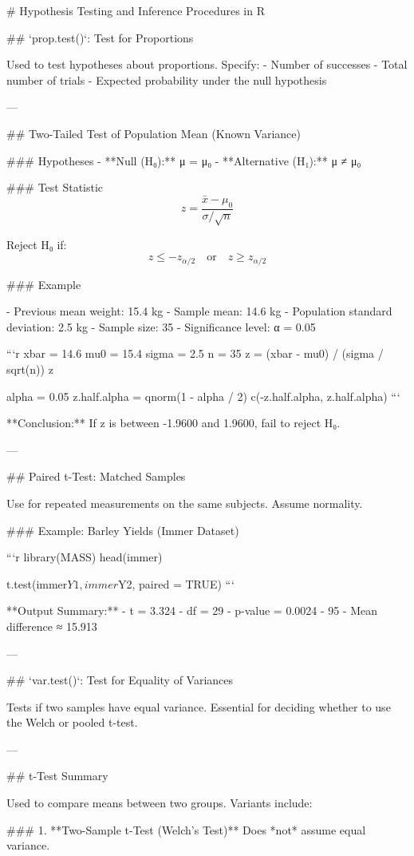 # Hypothesis Testing and Inference Procedures in R

## `prop.test()`: Test for Proportions

Used to test hypotheses about proportions. Specify:
- Number of successes
- Total number of trials
- Expected probability under the null hypothesis

---

## Two-Tailed Test of Population Mean (Known Variance)

### Hypotheses
- **Null (H₀):** μ = μ₀
- **Alternative (H₁):** μ ≠ μ₀

### Test Statistic
\[
z = \frac{\bar{x} - \mu_0}{\sigma / \sqrt{n}}
\]

Reject H₀ if:
\[
z \leq -z_{\alpha/2} \quad \text{or} \quad z \geq z_{\alpha/2}
\]

### Example

- Previous mean weight: 15.4 kg
- Sample mean: 14.6 kg
- Population standard deviation: 2.5 kg
- Sample size: 35
- Significance level: α = 0.05

```r
xbar = 14.6
mu0 = 15.4
sigma = 2.5
n = 35
z = (xbar - mu0) / (sigma / sqrt(n))
z

alpha = 0.05
z.half.alpha = qnorm(1 - alpha / 2)
c(-z.half.alpha, z.half.alpha)
```

**Conclusion:** If z is between -1.9600 and 1.9600, fail to reject H₀.

---

## Paired t-Test: Matched Samples

Use for repeated measurements on the same subjects. Assume normality.

### Example: Barley Yields (Immer Dataset)

```r
library(MASS)
head(immer)

t.test(immer$Y1, immer$Y2, paired = TRUE)
```

**Output Summary:**
- t = 3.324
- df = 29
- p-value = 0.0024
- 95%
- Mean difference ≈ 15.913

---

## `var.test()`: Test for Equality of Variances

Tests if two samples have equal variance. Essential for deciding whether to use the Welch or pooled t-test.

---

## t-Test Summary

Used to compare means between two groups. Variants include:

### 1. **Two-Sample t-Test (Welch’s Test)**  
Does *not* assume equal variance.

